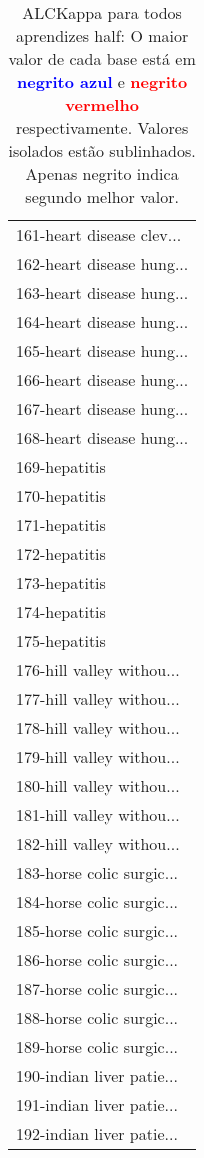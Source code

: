 \begin{table}[h]
\caption{ALCKappa para todos aprendizes half: O maior valor de cada base está em \textcolor{blue}{\textbf{negrito azul}} e \textcolor{red}{\textbf{negrito vermelho}} respectivamente. Valores isolados estão sublinhados. Apenas negrito indica segundo melhor valor.}
\begin{center}\begin{tabular}{l}
 & \\ \hline 161-heart disease clev... &  \\
162-heart disease hung... &  \\
163-heart disease hung... &  \\
164-heart disease hung... &  \\
165-heart disease hung... &  \\
166-heart disease hung... &  \\
167-heart disease hung... &  \\ \hline
168-heart disease hung... &  \\
169-hepatitis &  \\
170-hepatitis &  \\
171-hepatitis &  \\
172-hepatitis &  \\
173-hepatitis &  \\
174-hepatitis &  \\ \hline
175-hepatitis &  \\
176-hill valley withou... &  \\
177-hill valley withou... &  \\
178-hill valley withou... &  \\
179-hill valley withou... &  \\
180-hill valley withou... &  \\
181-hill valley withou... &  \\ \hline
182-hill valley withou... &  \\
183-horse colic surgic... &  \\
184-horse colic surgic... &  \\
185-horse colic surgic... &  \\
186-horse colic surgic... &  \\
187-horse colic surgic... &  \\
188-horse colic surgic... &  \\ \hline
189-horse colic surgic... &  \\
190-indian liver patie... &  \\
191-indian liver patie... &  \\
192-indian liver patie... &  \\\end{tabular}\label{stratsALCKappa5AllReduxb}
\end{center}
\end{table}
